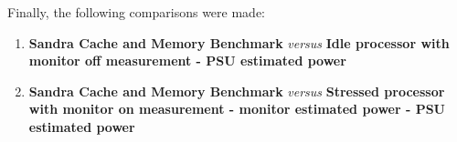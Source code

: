             Finally, the following comparisons were made:

            \begin{enumerate}
                \item \textbf{Sandra Cache and Memory Benchmark} \emph{versus} \textbf{Idle processor with monitor off measurement - PSU estimated power}
                \item \textbf{Sandra Cache and Memory Benchmark} \emph{versus} \textbf{Stressed processor with monitor on measurement - monitor estimated power - PSU estimated power}
            \end{enumerate}

